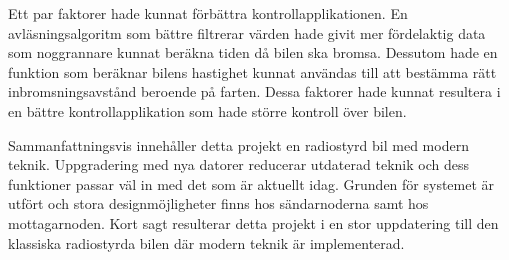 \documentclass[a4paper]{article}
\begin{document}
\vspace{5mm} \noindent
Ett par faktorer hade kunnat förbättra kontrollapplikationen. En avläsningsalgoritm som bättre filtrerar värden hade givit mer fördelaktig data som noggrannare kunnat beräkna tiden då bilen ska bromsa. Dessutom hade en funktion som beräknar bilens hastighet kunnat användas till att bestämma rätt inbromsningsavstånd beroende på farten. Dessa faktorer hade kunnat resultera i en bättre kontrollapplikation som hade större kontroll över bilen.













\vspace{5mm} \noindent
Sammanfattningsvis innehåller detta projekt en radiostyrd bil med modern teknik. Uppgradering med nya datorer reducerar utdaterad teknik och dess funktioner passar väl in med det som är aktuellt idag. Grunden för systemet är utfört och stora designmöjligheter finns hos sändarnoderna samt hos mottagarnoden. Kort sagt resulterar detta projekt i en stor uppdatering till den klassiska radiostyrda bilen där modern teknik är implementerad.
\end{document}
